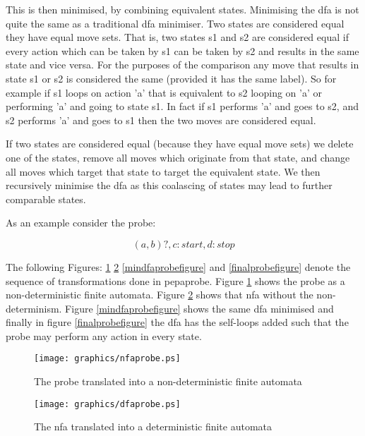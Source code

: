 \documentclass[10pt,a4paper]{article}
\newcommand{\pepaprobe}{\textsf{pepaprobe}}
\begin{document}
This is then minimised, by combining equivalent states.
Minimising the dfa is not quite the same as a traditional dfa
minimiser. Two states are considered equal they have equal
move sets. That is, two states s1 and s2 are considered equal if
every action which can be taken by s1 can be taken by s2 and results
in the same state and vice versa. For the purposes of the comparison any
move that results in state s1 or s2 is considered the same (provided
it has the same label). So for example if s1 loops on action
'a' that is equivalent to s2 looping on 'a' or performing 'a' and
going to state s1. In fact if s1 performs 'a' and goes to s2, and s2
performs 'a' and goes to s1 then the two moves are considered equal.

If two states are considered equal (because they have equal move sets)
we delete one of the states, remove all moves which originate from that
state, and change all moves which target that state to target the
equivalent state. We then recursively minimise the dfa as this
coalascing of states may lead to further comparable states.

As an example consider the probe:

\begin{displaymath}
(a, b)?, c:start, d:stop
\end{displaymath}

The following Figures:
\ref{nfaprobefigure}
\ref{dfaprobefigure}
\ref{mindfaprobefigure}
and
\ref{finalprobefigure}
denote the sequence of transformations done in \pepaprobe.
Figure \ref{nfaprobefigure} shows the probe as a non-deterministic finite
automata. Figure \ref{dfaprobefigure} shows that nfa without the non-determinism.
Figure \ref{mindfaprobefigure} shows the same dfa minimised and finally
in figure \ref{finalprobefigure} the dfa has the self-loops added such that the
probe may perform any action in every state.


\begin{figure}[htb]
\begin{center}
\texttt{[image: graphics/nfaprobe.ps]}
\end{center}
\caption{
\label{nfaprobefigure}
The probe translated into a non-deterministic finite automata
}
\end{figure}

\begin{figure}[htb]
\begin{center}
\texttt{[image: graphics/dfaprobe.ps]}
\end{center}
\caption{
\label{dfaprobefigure}
The nfa translated into a deterministic finite automata
}
\end{figure}
\end{document}
